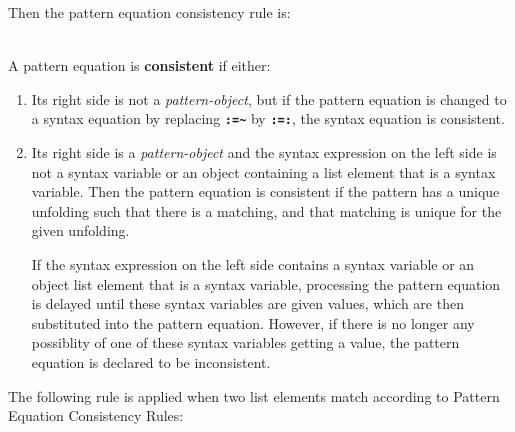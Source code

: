 \documentclass[12pt]{article}
\newcommand{\TT}[1]{{\tt \bfseries #1}}
\newcommand{\key}[1]{{\rm \bfseries #1}}
\newcommand{\TILDE}{\textasciitilde}
\newenvironment{indpar}[1][0.3in]%
	{\begin{list}{}%
		     {\setlength{\itemsep}{0in}%
		      \setlength{\topsep}{0in}%
		      \setlength{\parsep}{1ex}%
		      \setlength{\labelwidth}{#1}%
		      \setlength{\leftmargin}{#1}%
		      \addtolength{\leftmargin}{\labelsep}}%
	 \item}%
	{\end{list}}
\begin{document}
Then the pattern equation consistency rule is:

\begin{indpar}
\begin{list}{}{}
\item[\key{Pattern Equation Consistency Rule}%
           :] ~\\
A pattern equation is \key{consistent} if either:
\begin{enumerate}
\item
Its right side is not a {\em pattern-object}, but if the
pattern equation is changed to a syntax equation by
replacing \TT{:=\TILDE} by \TT{:=:}, the syntax equation is consistent.
\item
Its right
side is a {\em pattern-object} and
the syntax expression on the left side is not a syntax
variable or an object containing a list element that is
a syntax variable.  Then the pattern equation is consistent if
the pattern has a unique unfolding such that there is a matching,
and that matching is unique for the given unfolding.

\medskip

If the syntax expression on the left side contains a syntax
variable or an object list element that is a syntax variable,
processing the pattern equation is delayed until these
syntax variables are given values, which are then substituted
into the pattern equation.  However, if there is no longer
any possiblity of one of these syntax variables getting a value,
the pattern equation is declared to be inconsistent.

\end{enumerate}

\end{list}
\end{indpar}

The following rule is applied when two list elements match according
to Pattern Equation Consistency Rules:
\end{document}
